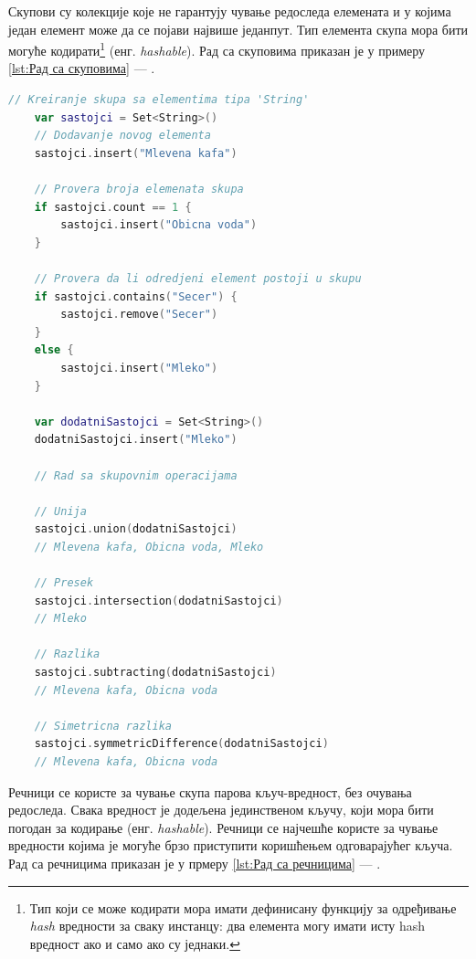 \documentclass[12pt,oneside]{memoir}
\begin{document}
\indent Скупови су колекције које не гарантују чување редоследа елемената и у којима један елемент може да се појави највише једанпут. Тип елемента скупа мора бити могуће кодирати\footnote{Тип који се може кодирати мора имати дефинисану функцију за одређивање \textit{hash} вредности за сваку инстанцу: два елемента могу имати исту hash вредност ако и само ако су једнаки.} (енг. \textit{hashable}). Рад са скуповима приказан је у примеру \ref{lst:Рад са скуповима} --- .

\begin{lstlisting}[caption=\textit{{Рад са скуповима}}, label={lst:Рад са скуповима}, language=Swift, frame=single]
    // Kreiranje skupa sa elementima tipa 'String'
    var sastojci = Set<String>()
    // Dodavanje novog elementa
    sastojci.insert("Mlevena kafa")
    
    // Provera broja elemenata skupa
    if sastojci.count == 1 {
        sastojci.insert("Obicna voda")
    }
    
    // Provera da li odredjeni element postoji u skupu
    if sastojci.contains("Secer") {
        sastojci.remove("Secer")
    }
    else {
        sastojci.insert("Mleko")
    }
    
    var dodatniSastojci = Set<String>()
    dodatniSastojci.insert("Mleko")
    
    // Rad sa skupovnim operacijama
    
    // Unija
    sastojci.union(dodatniSastojci)
    // Mlevena kafa, Obicna voda, Mleko
    
    // Presek
    sastojci.intersection(dodatniSastojci)
    // Mleko
    
    // Razlika
    sastojci.subtracting(dodatniSastojci)
    // Mlevena kafa, Obicna voda
    
    // Simetricna razlika
    sastojci.symmetricDifference(dodatniSastojci)
    // Mlevena kafa, Obicna voda
\end{lstlisting}

\indent Речници се користе за чување скупа парова кључ-вредност, без очувања редоследа. Свака вредност је додељена јединственом кључу, који мора бити погодан за кодирање (енг. \textit{hashable}). Речници се најчешће користе за чување вредности којима је могуће брзо приступити коришћењем одговарајућег кључа. Рад са речницима приказан је у прмеру \ref{lst:Рад са речницима} --- .
\end{document}

